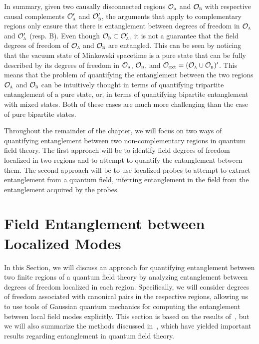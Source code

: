 \documentclass[letterpaper,12pt,titlepage,oneside,final]{book}
\newcommand{\tc}[1]{\textsc{#1}}
\begin{document}
In summary, given two causally disconnected regions $\mathcal{O}_\tc{a}$ and $\mathcal{O}_\tc{b}$ with respective causal complements $\mathcal{O}_\tc{a}'$ and $\mathcal{O}_\tc{b}'$, the arguments that apply to complementary regions only ensure that there is entanglement between degrees of freedom in $\mathcal{O}_\tc{a}$ and $\mathcal{O}_\tc{a}'$ (resp. B). Even though $\mathcal{O}_\tc{b}\subset\mathcal{O}_\tc{a}'$, it is not a guarantee that the field degrees of freedom of $\mathcal{O}_\tc{a}$ and $\mathcal{O}_\tc{b}$ are entangled. This can be seen by noticing that the vacuum state of Minkowski spacetime is a pure state that can be fully described by its degrees of freedom in $\mathcal{O}_\tc{a}$, $\mathcal{O}_\tc{b}$, and $\mathcal{O}_\text{ext}=(\mathcal{O}_\tc{a}\cup\mathcal{O}_\tc{b})'$. This means that the problem of quantifying the entanglement between the two regions $\mathcal{O}_\tc{a}$ and $\mathcal{O}_\tc{b}$ can be intuitively thought in terms of quantifying tripartite entanglement of a pure state, or, in terms of quantifying bipartite entanglement with mixed states. Both of these cases are much more challenging than the case of pure bipartite states.

Throughout the remainder of the chapter, we will focus on two ways of quantifying entanglement between two non-complementary regions in quantum field theory. The first approach will be to identify field degrees of freedom localized in two regions and to attempt to quantify the entanglement between them. The second approach will be to use localized probes to attempt to extract entanglement from a quantum field, inferring entanglement in the field from the entanglement acquired by the probes. 




\section{Field Entanglement between Localized Modes}\label{sec:modeEntanglement}

In this Section, we will discuss an approach for quantifying entanglement between two finite regions of a quantum field theory by analyzing entanglement between degrees of freedom localized in each region. Specifically, we will consider degrees of freedom associated with canonical pairs in the respective regions, allowing us to use tools of Gaussian quantum mechanics for computing the entanglement between local field modes explicitly. This section is based on the results of~\cite{patriciaAndI}, but we will also summarize the methods discussed in~\cite{KlcoUVIR,KlcoEntStrQFTI,KlcoEntStrQFTII,KlcoEntAllDist}, which have yielded important results regarding entanglement in quantum field theory.
\end{document}
